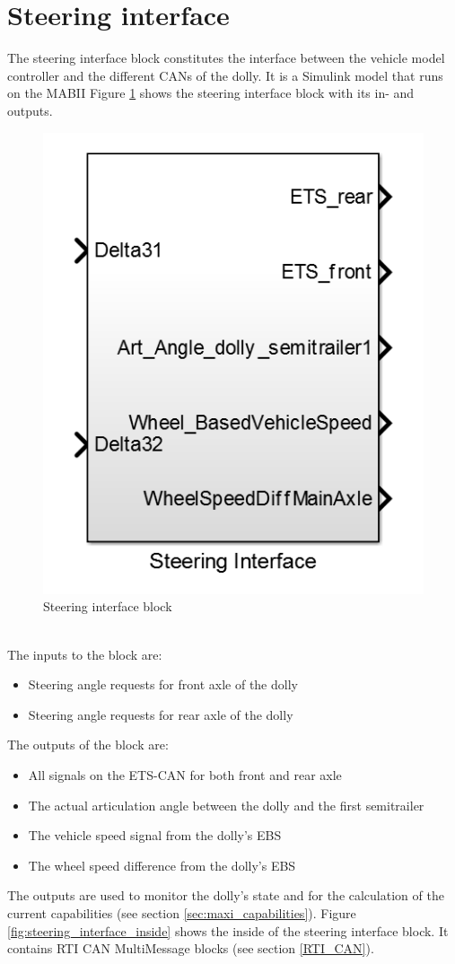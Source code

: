 \documentclass[ExampleMasters.tex]{subfiles}
\begin{document}
\section{Steering interface}
\label{sec:steering_interface}
The steering interface block constitutes the interface between the vehicle model controller and the different \gls{CAN}s of the dolly. It is a Simulink model that runs on the \gls{MABII}
Figure \ref{fig:steering_interface} shows the steering interface block with its in- and outputs. 
\begin{figure}[!htb]
	\centering
	\includegraphics[width=0.5\linewidth]{figures/steering_interface}
	
	\caption{Steering interface block}
	\label{fig:steering_interface}
\end{figure} \\
The inputs to the block are:
\begin{itemize}
	\item Steering angle requests for front axle of the dolly 
	\item Steering angle requests for rear axle of the dolly 
\end{itemize} 
 The outputs of the block are:
 \begin{itemize}
 	\item All signals on the \gls{ETS}-\gls{CAN} for both front and rear axle
 	\item The actual articulation angle between the dolly and the first semitrailer
 	\item The vehicle speed signal from the dolly's \gls{EBS}
 	\item The wheel speed difference from the dolly's \gls{EBS}
 \end{itemize}
 The outputs are used to monitor the dolly's state and for the calculation of the current capabilities (see section \ref{sec:maxi_capabilities}).
 Figure \ref{fig:steering_interface_inside} shows the inside of the steering interface block. It contains \gls{RTI} \gls{CAN} MultiMessage blocks (see section \ref{RTI_CAN}).   
 
\end{document}
